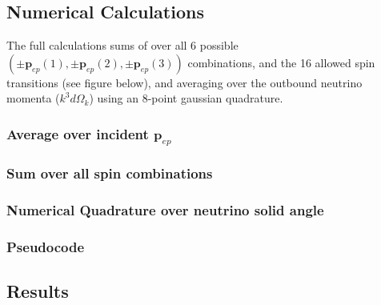 \documentclass[11pt]{amsart}
\begin{document}
\subsection{Numerical Calculations}

 The full calculations sums of over all 6 possible $(\pm\mathbf{p}_{ep}(1),\pm\mathbf{p}_{ep}(2),\pm\mathbf{p}_{ep}(3) )$ combinations, and the 16 allowed spin transitions (see figure below), and averaging over the outbound neutrino momenta ($k^{3}d\Omega_k$) using an 8-point gaussian quadrature. 

\subsubsection{Average over incident $\mathbf{p}_{ep}$}

\subsubsection{Sum over all spin combinations}

\subsubsection{Numerical Quadrature over neutrino solid angle}

\subsubsection{Pseudocode}


\subsection{Results}
\end{document}
